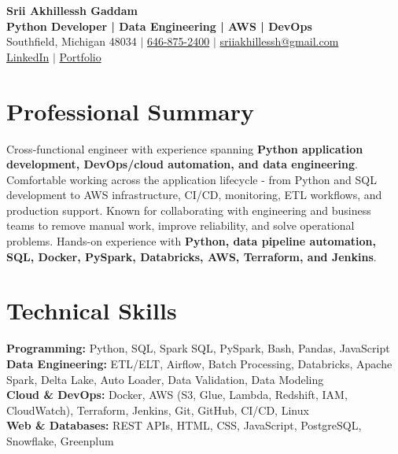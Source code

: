 \documentclass[letterpaper,10pt]{article}
\begin{document}
\fontsize{9.35pt}{10.45pt}\selectfont

\begin{center}
    {\LARGE \textbf{Srii Akhillessh Gaddam}} \\[-1pt]
    \textbf{Python Developer | Data Engineering | AWS | DevOps} \\[2pt]
    Southfield, Michigan 48034 $|$
    \href{tel:6468752400}{646-875-2400} $|$
    \href{mailto:sriiakhillessh@gmail.com}{sriiakhillessh@gmail.com} \\[1pt]
    \href{https://www.linkedin.com/in/srii-akhiilessh-gaddam-b48668191/}{LinkedIn} $|$
    \href{https://sriiakhillesshg.github.io/portfolio/}{Portfolio}
\end{center}
\vspace{-8pt}

\section{Professional Summary}
\small{Cross-functional engineer with experience spanning \textbf{Python application development, DevOps/cloud automation, and data engineering}. Comfortable working across the application lifecycle - from Python and SQL development to AWS infrastructure, CI/CD, monitoring, ETL workflows, and production support. Known for collaborating with engineering and business teams to remove manual work, improve reliability, and solve operational problems. Hands-on experience with \textbf{Python, data pipeline automation, SQL, Docker, PySpark, Databricks, AWS, Terraform, and Jenkins}.}

\section{Technical Skills}
\small{
\textbf{Programming:} Python, SQL, Spark SQL, PySpark, Bash, Pandas, JavaScript \\
\textbf{Data Engineering:} ETL/ELT, Airflow, Batch Processing, Databricks, Apache Spark, Delta Lake, Auto Loader, Data Validation, Data Modeling \\
\textbf{Cloud \& DevOps:} Docker, AWS (S3, Glue, Lambda, Redshift, IAM, CloudWatch), Terraform, Jenkins, Git, GitHub, CI/CD, Linux \\
\textbf{Web \& Databases:} REST APIs, HTML, CSS, JavaScript, PostgreSQL, Snowflake, Greenplum
}
\end{document}
